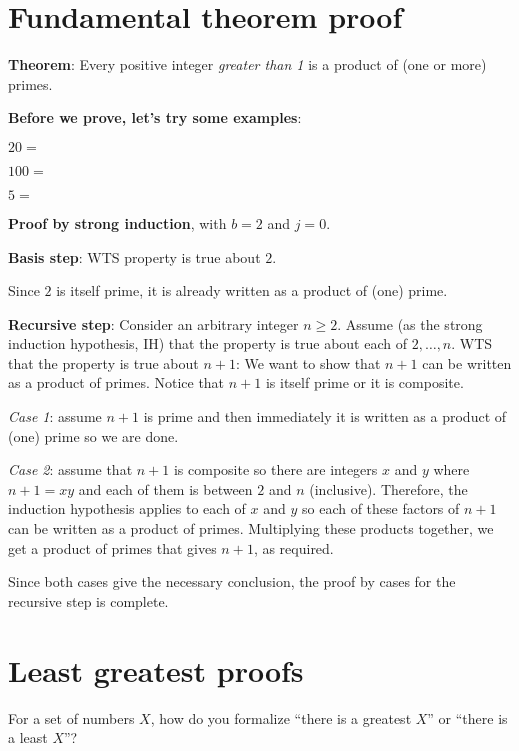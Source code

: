 \documentclass[12pt, oneside]{article}
\begin{document}
\begin{flushright}
\end{flushright} \section*{Fundamental theorem proof}


{\bf Theorem}: Every positive integer {\it greater than 1} is a product of (one or more) primes.

{\bf Before we prove, let's try some examples}:

$20 = $

$100 = $

$5 = $


{\bf Proof by strong induction}, with $b=2$ and $j=0$.

{\bf Basis step}:  WTS property is true about  $2$.

Since $2$ is itself prime,
it is already written as a product of (one) prime.


{\bf Recursive step}: Consider an arbitrary integer $n \geq 2$.
Assume (as the strong induction hypothesis, IH) that the property is true about  each of $2, \ldots, n$.  
WTS that the property is true about  $n+1$: We want to show that $n+1$ can be written 
as a product of primes.  Notice that $n+1$ is itself prime or it is composite.

{\it Case 1}: assume $n+1$ is prime and then immediately it is written as a product
of (one) prime so we are done.  

{\it Case 2}: assume that $n+1$ is composite
so there are integers $x$ and $y$ where $n+1 = xy$ and each of them is between $2$ and $n$
(inclusive).  Therefore, the induction hypothesis applies to each of $x$ and $y$ so each 
of these factors of $n+1$ can be written as a product of primes.  Multiplying these products together, 
we get a product of primes that gives $n+1$, as required. 

Since both cases give the necessary
conclusion, the proof by cases for the recursive step is complete. \vfill
\section*{Least greatest proofs}


For a set of numbers $X$, how do you formalize ``there is a greatest $X$'' 
or ``there is a least $X$''?

\vspace{30pt}
\end{document}
